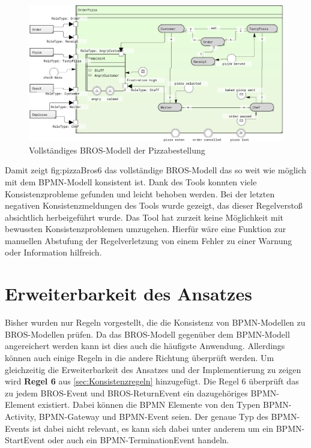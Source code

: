 \begin{figure}
    \centering
    \includegraphics[width=\textwidth,keepaspectratio]{../images/example/bros-rule6.png}%
    \caption{Vollständiges BROS-Modell der Pizzabestellung}%
    \label{fig:pizzaBros6}
\end{figure}

Damit zeigt {fig:pizzaBros6} das vollständige BROS-Modell das so weit wie möglich mit dem BPMN-Modell konsistent ist.
Dank des Tools konnten viele Konsistenzprobleme gefunden und leicht behoben werden.
Bei der letzten negativen Konsistenzmeldungen des Tools wurde gezeigt, das dieser Regelverstoß absichtlich herbeigeführt wurde.
Das Tool hat zurzeit keine Möglichkeit mit bewussten Konsistenzproblemen umzugehen.
Hierfür wäre eine Funktion zur manuellen Abstufung der Regelverletzung von einem Fehler zu einer Warnung oder Information hilfreich.

\section{Erweiterbarkeit des Ansatzes}

Bisher wurden nur Regeln vorgestellt, die die Konsistenz von BPMN-Modellen zu BROS-Modellen prüfen.
Da das BROS-Modell gegenüber dem BPMN-Modell angereichert werden kann ist dies auch die häufigste Anwendung.
Allerdings können auch einige Regeln in die andere Richtung überprüft werden.
Um gleichzeitig die Erweiterbarkeit des Ansatzes und der Implementierung zu zeigen wird \textbf{Regel 6} aus \cref{sec:Konsistenzregeln} hinzugefügt.
Die Regel 6 überprüft das zu jedem BROS-Event und BROS-ReturnEvent ein dazugehöriges BPMN-Element existiert. 
Dabei können die BPMN Elemente von den Typen BPMN-Activity, BPMN-Gateway und BPMN-Event seien. 
Der genaue Typ des BPMN-Events ist dabei nicht relevant, es kann sich dabei unter anderem um ein BPMN-StartEvent oder auch ein BPMN-TerminationEvent handeln.

